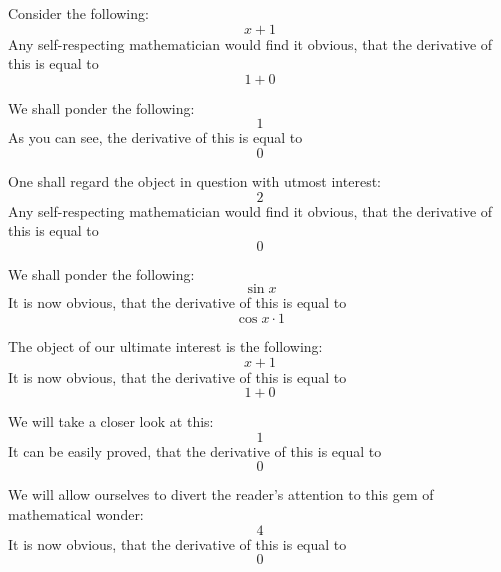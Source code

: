 \documentclass{article}
\begin{document}
Consider the following:
\begin{equation}
x + 1 
\end{equation}
Any self-respecting mathematician would find it obvious, that the derivative of this is equal to
\begin{equation}
1 + 0 
\end{equation}

We shall ponder the following:
\begin{equation}
1 
\end{equation}
As you can see, the derivative of this is equal to
\begin{equation}
0 
\end{equation}

One shall regard the object in question with utmost interest:
\begin{equation}
2 
\end{equation}
Any self-respecting mathematician would find it obvious, that the derivative of this is equal to
\begin{equation}
0 
\end{equation}

We shall ponder the following:
\begin{equation}
\sin x 
\end{equation}
It is now obvious, that the derivative of this is equal to
\begin{equation}
\cos x \cdot 1 
\end{equation}

The object of our ultimate interest is the following:
\begin{equation}
x + 1 
\end{equation}
It is now obvious, that the derivative of this is equal to
\begin{equation}
1 + 0 
\end{equation}

We will take a closer look at this:
\begin{equation}
1 
\end{equation}
It can be easily proved, that the derivative of this is equal to
\begin{equation}
0 
\end{equation}

We will allow ourselves to divert the reader's attention to this gem of mathematical wonder:
\begin{equation}
4 
\end{equation}
It is now obvious, that the derivative of this is equal to
\begin{equation}
0 
\end{equation}
\end{document}
